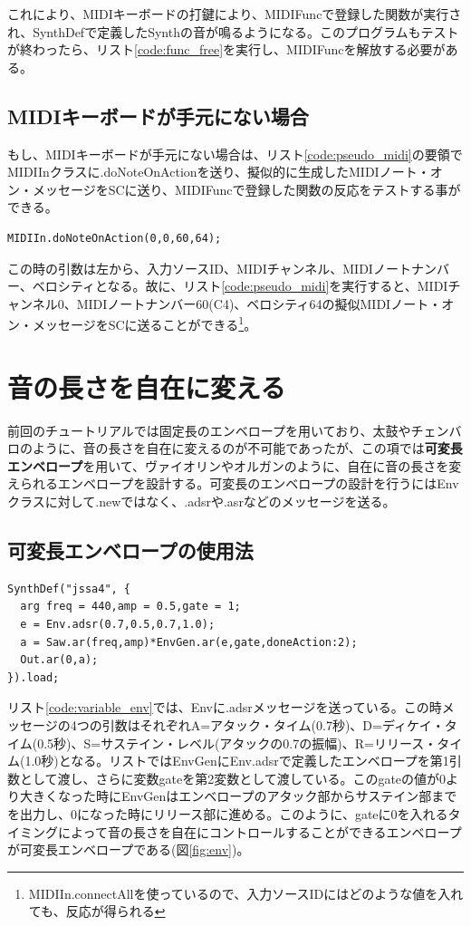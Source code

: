 \documentclass{jsarticle}
\begin{document}
これにより、MIDIキーボードの打鍵により、MIDIFuncで登録した関数が実行され、SynthDefで定義したSynthの音が鳴るようになる。このプログラムもテストが終わったら、リスト\ref{code:func_free}を実行し、MIDIFuncを解放する必要がある。

\subsection{MIDIキーボードが手元にない場合}
もし、MIDIキーボードが手元にない場合は、リスト\ref{code:pseudo_midi}の要領でMIDIInクラスに.doNoteOnActionを送り、擬似的に生成したMIDIノート・オン・メッセージをSCに送り、MIDIFuncで登録した関数の反応をテストする事ができる。

\begin{lstlisting}[caption=擬似的にMIDIメッセージを送る,label=code:pseudo_midi]
MIDIIn.doNoteOnAction(0,0,60,64);
\end{lstlisting}

この時の引数は左から、入力ソースID、MIDIチャンネル、MIDIノートナンバー、ベロシティとなる。故に、リスト\ref{code:pseudo_midi}を実行すると、MIDIチャンネル0、MIDIノートナンバー60(C4)、ベロシティ64の擬似MIDIノート・オン・メッセージをSCに送ることができる\footnote{MIDIIn.connectAllを使っているので、入力ソースIDにはどのような値を入れても、反応が得られる}。

\section{音の長さを自在に変える}
前回のチュートリアルでは固定長のエンベロープを用いており、太鼓やチェンバロのように、音の長さを自在に変えるのが不可能であったが、この項では{\bf 可変長エンベロープ}を用いて、ヴァイオリンやオルガンのように、自在に音の長さを変えられるエンベロープを設計する。可変長のエンベロープの設計を行うにはEnvクラスに対して.newではなく、.adsrや.asrなどのメッセージを送る。

\subsection{可変長エンベロープの使用法}

\begin{lstlisting}[caption=可変長エンベロープの定義,label=code:variable_env]
SynthDef("jssa4", {
  arg freq = 440,amp = 0.5,gate = 1;
  e = Env.adsr(0.7,0.5,0.7,1.0);
  a = Saw.ar(freq,amp)*EnvGen.ar(e,gate,doneAction:2);
  Out.ar(0,a);
}).load;
\end{lstlisting}


リスト\ref{code:variable_env}では、Envに.adsrメッセージを送っている。この時メッセージの4つの引数はそれぞれA=アタック・タイム(0.7秒)、D=ディケイ・タイム(0.5秒)、S=サステイン・レベル(アタックの0.7の振幅)、R=リリース・タイム(1.0秒)となる。リストではEnvGenにEnv.adsrで定義したエンベロープを第1引数として渡し、さらに変数gateを第2変数として渡している。このgateの値が0より大きくなった時にEnvGenはエンベロープのアタック部からサステイン部までを出力し、0になった時にリリース部に進める。このように、gateに0を入れるタイミングによって音の長さを自在にコントロールすることができるエンベロープが可変長エンベロープである(図\ref{fig:env})。
\end{document}

